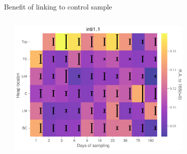 \documentclass[mathserif,11pt]{beamer}
\begin{document}
\begin{frame}{Benefit of linking to control sample}
{\begin{columns}
\begin{column}{0.5\textwidth}
		\end{column}
		\begin{column}{0.5\textwidth}
		\centering
			\includegraphics[width=0.7\textwidth]{Figures/changed_errorbar_day0.png}
		\end{column}
	\end{columns}}
\end{frame}
\end{document}
